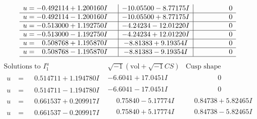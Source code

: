 \documentclass[1p]{elsarticle_modified}
\theoremstyle{definition}
\newcommand{\I}{\sqrt{-1}}
\begin{document}
$$\begin{array}{c|c|c}
\begin{aligned}
u &= -0.492114 + 1.200160 I\end{aligned}
 & -10.05500 - 8.77175 I & \phantom{-0.000000 } 0 \\ \hline\begin{aligned}
u &= -0.492114 - 1.200160 I\end{aligned}
 & -10.05500 + 8.77175 I & \phantom{-0.000000 } 0 \\ \hline\begin{aligned}
u &= -0.513000 + 1.192750 I\end{aligned}
 & -4.24234 - 12.01220 I & \phantom{-0.000000 } 0 \\ \hline\begin{aligned}
u &= -0.513000 - 1.192750 I\end{aligned}
 & -4.24234 + 12.01220 I & \phantom{-0.000000 } 0 \\ \hline\begin{aligned}
u &= \phantom{-}0.508768 + 1.195870 I\end{aligned}
 & -8.81383 + 9.19354 I & \phantom{-0.000000 } 0 \\ \hline\begin{aligned}
u &= \phantom{-}0.508768 - 1.195870 I\end{aligned}
 & -8.81383 - 9.19354 I & \phantom{-0.000000 } 0\\
 \hline 
 \end{array}$$\newpage$$\begin{array}{c|c|c}  
\text{Solutions to }I^u_{1}& \I (\text{vol} + \sqrt{-1}CS) & \text{Cusp shape}\\
 \hline 
\begin{aligned}
u &= \phantom{-}0.514711 + 1.194780 I\end{aligned}
 & -6.6041 + 17.0451 I & \phantom{-0.000000 } 0 \\ \hline\begin{aligned}
u &= \phantom{-}0.514711 - 1.194780 I\end{aligned}
 & -6.6041 - 17.0451 I & \phantom{-0.000000 } 0 \\ \hline\begin{aligned}
u &= \phantom{-}0.661537 + 0.209917 I\end{aligned}
 & \phantom{-}0.75840 - 5.17774 I & \phantom{-}0.84738 + 5.82465 I \\ \hline\begin{aligned}
u &= \phantom{-}0.661537 - 0.209917 I\end{aligned}
 & \phantom{-}0.75840 + 5.17774 I & \phantom{-}0.84738 - 5.82465 I \\ \hline\begin{aligned}

\end{aligned}
\end{array}$$
\end{document}
